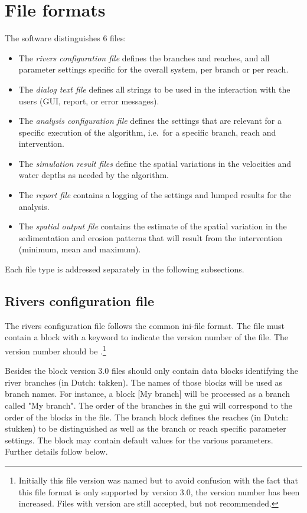 \chapter{File formats}

The software distinguishes 6 files:

\begin{itemize}
\item The \emph{rivers configuration file} defines the branches and reaches, and all parameter settings specific for the overall system, per branch or per reach.
\item The \emph{dialog text file} defines all strings to be used in the interaction with the users (GUI, report, or error messages).
\item The \emph{analysis configuration file} defines the settings that are relevant for a specific execution of the algorithm, i.e.~for a specific branch, reach and intervention.
\item The \emph{simulation result files} define the spatial variations in the velocities and water depths as needed by the algorithm.
\item The \emph{report file} contains a logging of the settings and lumped results for the analysis.
\item The \emph{spatial output file} contains the estimate of the spatial variation in the sedimentation and erosion patterns that will result from the intervention (minimum, mean and maximum).
\end{itemize}

Each file type is addressed separately in the following subsections.

\section{Rivers configuration file}

The rivers configuration file follows the common ini-file format.
The file must contain a \keyw{[General]} block with a keyword  to indicate the version number of the file.
The version number should be .\footnote{Initially this file version was named  but to avoid confusion with the fact that this file format is only supported by \dfastmi version 3.0, the version number has been increased.
Files with version  are still accepted, but not recommended.}

Besides the \keyw{[General]} block version 3.0 files should only contain data blocks identifying the river branches (in Dutch: takken).
The names of those blocks will be used as branch names.
For instance, a block [My branch] will be processed as a branch called "My branch".
The order of the branches in the gui will correspond to the order of the blocks in the file.
The branch block defines the reaches (in Dutch: stukken) to be distinguished as well as the branch or reach specific parameter settings.
The \keyw{[General]} block may contain default values for the various parameters.
Further details follow below.

